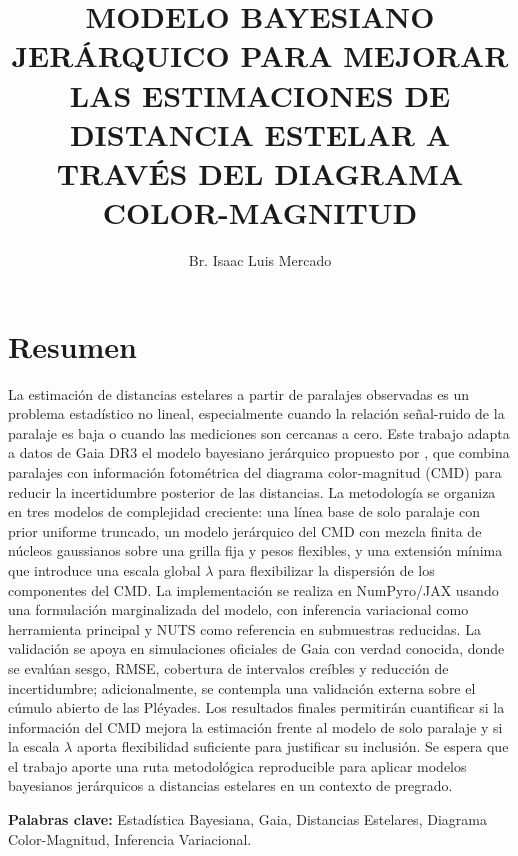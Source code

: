 \documentclass[stu, 12pt, letterpaper, donotrepeattitle, floatsintext, natbib]{apa7_ula}
\title{
    \uppercase{\large Modelo Bayesiano Jerárquico para Mejorar las
    Estimaciones de Distancia Estelar a través del
    Diagrama Color-Magnitud}
}
\author{Br. Isaac Luis Mercado}
\begin{document}
\maketitle
\thispagestyle{empty}

\clearpage
{}

\section*{Resumen}
La estimación de distancias estelares a partir de paralajes observadas
es un problema estadístico no lineal, especialmente cuando la relación
señal-ruido de la paralaje es baja o cuando las mediciones son cercanas
a cero. Este trabajo adapta a datos de Gaia DR3 el modelo bayesiano
jerárquico propuesto por \citet{Leistedt_2017}, que combina paralajes
con información fotométrica del diagrama color-magnitud (CMD) para
reducir la incertidumbre posterior de las distancias. La metodología se
organiza en tres modelos de complejidad creciente: una línea base de
solo paralaje con prior uniforme truncado, un modelo jerárquico del CMD
con mezcla finita de núcleos gaussianos sobre una grilla fija y pesos
flexibles, y una extensión mínima que introduce una escala global
$\lambda$ para flexibilizar la dispersión de los componentes del CMD.
La implementación se realiza en NumPyro/JAX usando una formulación
marginalizada del modelo, con inferencia variacional como herramienta
principal y NUTS como referencia en submuestras reducidas. La validación
se apoya en simulaciones oficiales de Gaia con verdad conocida, donde se
evalúan sesgo, RMSE, cobertura de intervalos creíbles y reducción de
incertidumbre; adicionalmente, se contempla una validación externa sobre
el cúmulo abierto de las Pléyades. Los resultados finales permitirán
cuantificar si la información del CMD mejora la estimación frente al
modelo de solo paralaje y si la escala $\lambda$ aporta flexibilidad
suficiente para justificar su inclusión. Se espera que el trabajo aporte
una ruta metodológica reproducible para aplicar modelos bayesianos
jerárquicos a distancias estelares en un contexto de pregrado.

\textbf{Palabras clave:} Estadística Bayesiana, Gaia, Distancias Estelares, Diagrama Color-Magnitud, Inferencia Variacional.

\newpage

\renewcommand\contentsname{\large{Índice}}
\setcounter{tocdepth}{3}
\tableofcontents
\newpage

\renewcommand{\listfigurename}{\large{Índice de Figuras}}
\listoffigures
\newpage
\end{document}
